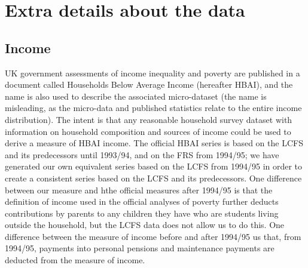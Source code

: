 \section{Extra details about the data }\label{data_annex}

\subsection{Income}
UK government assessments of income inequality and poverty are published in a document called Households Below Average Income (hereafter HBAI), and the name is also used to describe the associated micro-dataset (the name is misleading, as the micro-data and published statistics relate to the entire income distribution). The intent is that any reasonable household survey dataset with information on household composition and sources of income could be used to derive a measure of HBAI income. The official HBAI series is based on the LCFS and its predecessors until 1993/94, and on the FRS from 1994/95;  we have generated our own equivalent series based on the LCFS from 1994/95 in order to create a consistent series based on the LCFS and its predecessors. One difference between our measure and hthe official measures after 1994/95 is that the definition of income used in the official analyses of poverty further deducts contributions by parents to any children they have who are students living outside the household, but the LCFS data does not allow us to do this. One difference between  the measure of income before and after 1994/95 us that, from 1994/95,  payments into personal pensions and maintenance payments are deducted from the measure of income.

